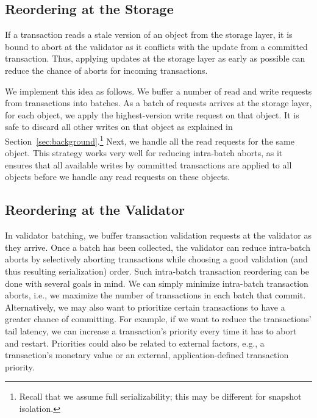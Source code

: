 \subsection{Reordering at the Storage}\label{subsec:storage_reordering}
If a transaction reads a stale version of an object from the storage layer, it is bound to 
abort at the validator as it conflicts with the update from a committed transaction. 
Thus, applying updates at the storage layer as early as possible can 
reduce the chance of aborts for incoming transactions.

We implement this idea as follows. We buffer a number of read and write requests from transactions into batches. 
As a batch of requests arrives at the storage layer, for each object, we apply the highest-version write request on that object. It is safe to discard all other writes on that object as explained in Section~\ref{sec:background}.\footnote{Recall that we assume full serializability; this may be different for snapshot isolation.} 
Next, we handle all the read requests for the same object. This strategy works very well for reducing intra-batch aborts, 
as it ensures that all available writes by committed transactions are applied to all objects before we handle any read requests on these objects. 

\subsection{Reordering at the Validator}\label{subsec:validator_reordering}

In validator batching, we buffer transaction validation requests at the validator as they arrive. Once a batch has been collected, the validator can reduce intra-batch aborts by selectively aborting transactions while choosing a good validation (and thus resulting serialization) order.
Such intra-batch transaction reordering can be done with several goals in mind. We can simply minimize intra-batch transaction aborts, i.e., we maximize the number of transactions in each batch that commit. Alternatively, we may also want to prioritize certain transactions to have a greater chance of committing. For example, if we want to reduce the transactions' tail latency, we can increase a transaction's priority every time it has to abort and restart. Priorities could also be related to external factors, e.g., a transaction's monetary value or an external, application-defined transaction priority. 

